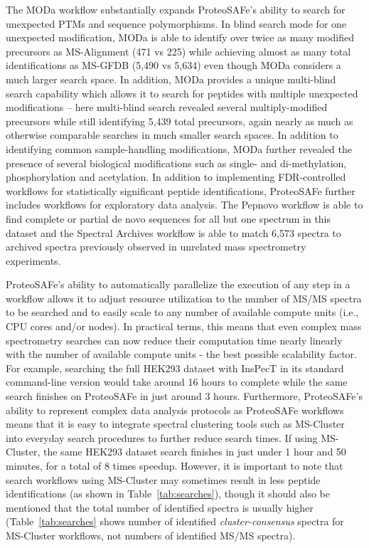 \documentclass[arial,11pt]{article}
\newcommand{\SF}[1]{\textsf{#1}}
\newcommand{\SYSTEM}[0]{\SF{ProteoSAFe}\xspace}
\begin{document}
The MODa workflow substantially expands \SYSTEM's ability to search for unexpected PTMs and sequence polymorphisms. In blind search mode for one unexpected modification, MODa is able to identify over twice as many modified precursors as MS-Alignment (471 vs 225) while achieving almost as many total identifications as MS-GFDB (5,490 vs 5,634) even though MODa considers a much larger search space. In addition, MODa provides a unique multi-blind search capability which allows it to search for peptides with multiple unexpected modifications -- here multi-blind search revealed several multiply-modified precursors while still identifying 5,439 total precursors, again nearly as much as otherwise comparable searches in much smaller search spaces. In addition to identifying common sample-handling modifications, MODa further revealed the presence of several biological modifications such as single- and di-methylation, phosphorylation and acetylation. In addition to implementing FDR-controlled workflows for statistically significant peptide identifications, \SYSTEM further includes workflows for exploratory data analysis. The Pepnovo workflow is able to find complete or partial de novo sequences for all but one spectrum in this dataset and the Spectral Archives workflow is able to match 6,573 spectra to archived spectra previously observed in unrelated mass spectrometry experiments.

\SYSTEM's ability to automatically parallelize the execution of any step in a workflow allows it to adjust resource utilization to the number of MS/MS spectra to be searched and to easily scale to any number of available compute units (i.e., CPU cores and/or nodes). In practical terms, this means that even complex mass spectrometry searches can now reduce their computation time nearly linearly with the number of available compute units - the best possible scalability factor. For example, searching the full HEK293 dataset with InsPecT in its standard command-line version would take around 16 hours to complete while the same search finishes on \SYSTEM in just around 3 hours. Furthermore, \SYSTEM's ability to represent complex data analysis protocols as \SYSTEM workflows means that it is easy to integrate spectral clustering tools such as MS-Cluster into everyday search procedures to further reduce search times. If using MS-Cluster, the same HEK293 dataset search finishes in just under 1 hour and 50 minutes, for a total of 8 times speedup. However, it is important to note that search workflows using MS-Cluster may sometimes result in less peptide identifications (as shown in Table~\ref{tab:searches}), though it should also be mentioned that the total number of identified spectra is usually higher (Table~\ref{tab:searches} shows number of identified {\em cluster-consensus} spectra for MS-Cluster workflows, not numbers of identified MS/MS spectra).
\end{document}
